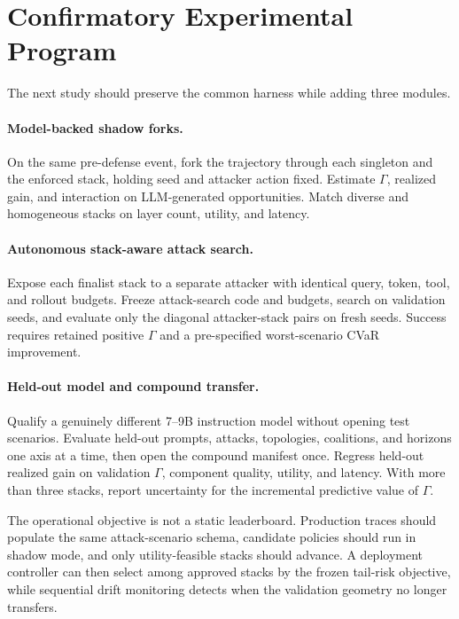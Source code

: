 \documentclass[10pt]{article}
\begin{document}
\section{Confirmatory Experimental Program}
The next study should preserve the common harness while adding three modules.

\paragraph{Model-backed shadow forks.}
On the same pre-defense event, fork the trajectory through each singleton and the enforced stack, holding seed and attacker action fixed. Estimate $\Gamma$, realized gain, and interaction on LLM-generated opportunities. Match diverse and homogeneous stacks on layer count, utility, and latency.

\paragraph{Autonomous stack-aware attack search.}
Expose each finalist stack to a separate attacker with identical query, token, tool, and rollout budgets. Freeze attack-search code and budgets, search on validation seeds, and evaluate only the diagonal attacker-stack pairs on fresh seeds. Success requires retained positive $\Gamma$ and a pre-specified worst-scenario CVaR improvement.

\paragraph{Held-out model and compound transfer.}
Qualify a genuinely different 7--9B instruction model without opening test scenarios. Evaluate held-out prompts, attacks, topologies, coalitions, and horizons one axis at a time, then open the compound manifest once. Regress held-out realized gain on validation $\Gamma$, component quality, utility, and latency. With more than three stacks, report uncertainty for the incremental predictive value of $\Gamma$.

The operational objective is not a static leaderboard. Production traces should populate the same attack-scenario schema, candidate policies should run in shadow mode, and only utility-feasible stacks should advance. A deployment controller can then select among approved stacks by the frozen tail-risk objective, while sequential drift monitoring detects when the validation geometry no longer transfers.
\end{document}

